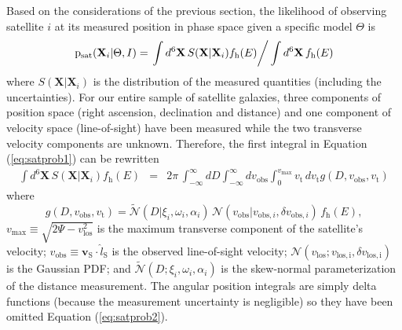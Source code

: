 \documentclass[preprint]{aastex}
\newcommand{\eqlabel}[1]{\label{eq:#1}}
\newcommand{\eq}[1]{Equation (\ref{eq:#1})}
\begin{document}
Based on the considerations of the previous section, the likelihood of observing
satellite $i$ at its measured position in phase space given a specific model $\Theta$ is
\begin{equation}
    \eqlabel{satprob1}
    \mathrm{p}_\mathrm{sat}(\mathbf{X}_i | \Theta,I) =
    \left . \int d^6 \mathbf{X} \, S(\mathbf{X} | \mathbf{X}_i) f_\mathrm{h} (E)
    \right /\int d^6 \mathbf{X} \, f_\mathrm{h} (E)
\end{equation}
where $S(\mathbf{X} | \mathbf{X}_i)$ is the distribution of the measured quantities
(including the uncertainties).  For our entire sample of satellite galaxies, three
components of position space (right ascension, declination and distance) and one
component of velocity space (line-of-sight) have been measured while the two
transverse velocity components are unknown.  Therefore, the first integral in
\eq{satprob1} can be rewritten
\begin{eqnarray}
    \eqlabel{satprob2}
    \int d^6 \mathbf{X} \, S(\mathbf{X} | \mathbf{X}_i) f_\mathrm{h} (E)
    & = & 2 \pi \, \int_{-\infty}^{\infty} dD \int_{-\infty}^{\infty} dv_\mathrm{obs}
    \int_0 ^{v_\mathrm{max}} v_{\mathrm{t}} \, dv_{\mathrm{t}}
    g(D,v_\mathrm{obs},v_\mathrm{t})
\end{eqnarray}
where
\begin{equation}
    g (D,v_\mathrm{obs},v_\mathrm{t})
    = \tilde{\mathcal{N}} (D | \xi_i, \omega_i, \alpha_i) \,
    \mathcal{N} (v_\mathrm{obs} | v_{\mathrm{obs},i},\delta v_{\mathrm{obs},i})\,
    f_\mathrm{h} (E)  ,
\end{equation}
$v_\mathrm{max} \equiv \sqrt{2 \Psi - v_\mathrm{los}^2}$ is the maximum transverse
component of the satellite's velocity;
$v_\mathrm{obs} \equiv \mathbf{v}_\mathrm{S} \cdot \hat{l}_\mathrm{S}$ is the
observed line-of-sight velocity;
$\mathcal{N} (v_\mathrm{los}; v_\mathrm{los,i},\delta v_\mathrm{los,i})$ is the
Gaussian PDF; and  $\tilde{\mathcal{N}} (D; \xi_i, \omega_i, \alpha_i)$ is the
skew-normal parameterization of the distance measurement.  The angular position
integrals are simply delta functions (because the measurement uncertainty is
negligible) so they have been omitted \eq{satprob2}.
\end{document}
